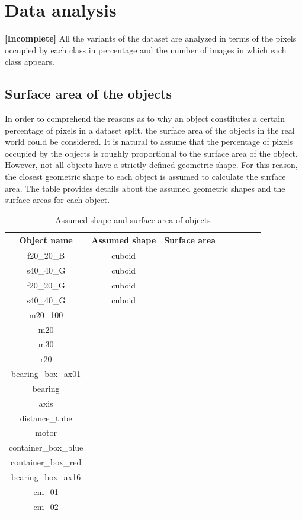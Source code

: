 \section{Data analysis}
\label{section:analysis}

\textbf{[Incomplete]}
	All the variants of the dataset are analyzed in terms of the pixels occupied by each class in percentage and the number of images in which each class appears. 
	
	\subsection{Surface area of the objects}
		
		In order to comprehend the reasons as to why an object constitutes a certain percentage of pixels in a dataset split, the surface area of the objects in the real world could be considered. It is natural to assume that the percentage of pixels occupied by the objects is roughly proportional to the surface area of the object. However, not all objects have a strictly defined geometric shape. For this reason, the closest geometric shape to each object is assumed to calculate the surface area. The table provides details about the assumed geometric shapes and the surface areas for each object.
		
		\begin{table}
			\centering
			\begin{tabular}{|c|c|c|c|c|c|c|c|}
			\hline 
  			\textbf{Object name} & \textbf{Assumed shape} & \textbf{Surface area} \\ 
			\hline
  			 f20\_20\_B & cuboid &  \\ 
			\hline
  			 s40\_40\_G & cuboid &  \\ 
			\hline
  			 f20\_20\_G & cuboid &  \\ 
			\hline
  			 s40\_40\_G & cuboid &  \\ 
			\hline
  			 m20\_100 &  &  \\ 
			\hline
  			 m20 &  &  \\ 
			\hline
  			 m30 &  &  \\ 
			\hline
  			 r20 &  &  \\ 
			\hline
  			 bearing\_box\_ax01 &  &  \\ 
			\hline
  			 bearing &  &  \\ 
			\hline
  			 axis &  &  \\ 
			\hline
  			 distance\_tube &  &  \\ 
			\hline
  			 motor &  &  \\ 
			\hline
  			 container\_box\_blue &  &  \\ 
			\hline
  			 container\_box\_red &  &  \\ 
			\hline
  			 bearing\_box\_ax16 &  &  \\ 
			\hline
  			 em\_01 &  &  \\ 
			\hline
  			 em\_02 &  &  \\ 
			\hline
			\end{tabular}
			\caption{Assumed shape and surface area of objects} 
			\label{Table:surface}
		\end{table}
		
